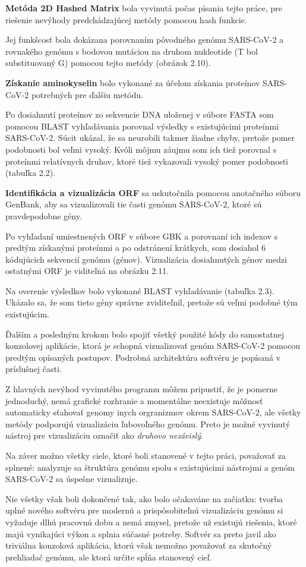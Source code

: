 \textbf{Metóda 2D Hashed Matrix } bola vyvinutá počas písania tejto práce, pre riešenie nevýhody predchádzajúcej metódy pomocou hash funkcie.

Jej funkšcosť bola dokázana porovnaním pôvodného genómu SARS-CoV-2 a rovnakého genómu s bodovou mutáciou na druhom nukleotide (T bol substituovaný G) pomocou tejto metódy (obrázok 2.10).

\textbf{Získanie aminokyselin} bolo vykonané za účelom získania proteínov SARS-CoV-2 potrebných pre ďalšiu metódu.

Po dosiahnutí proteínov zo sekvencie DNA uloženej v súbore FASTA som pomocou BLAST vyhľadávania porovnal výsledky s existujúcimi proteínmi SARS-CoV-2.
Súcit ukázal, že sa neurobili takmer žiadne chyby, pretože pomer podobnosti bol veľmi vysoký.
Kvôli môjmu záujmu som ich tiež porovnal s proteínmi relatívnych druhov, ktoré tiež vykazovali vysoký pomer podobnosti (tabuľka 2.2).

\textbf{Identifikácia a vizualizácia ORF} sa uskutočnila pomocou anotačného súboru GenBank, aby sa vizualizovali tie časti genómu SARS-CoV-2, ktoré sú pravdepodobne gény.

Po vyhľadaní umiestnených ORF v súbore GBK a porovnaní ich indexov s predtým získanými proteínmi a po odstránení krátkych, som dosiahol 6 kódujúcich sekvencií genómu (génov).
Vizualizácia dosiahnutých génov medzi ostatnými ORF je viditeľná na obrázku 2.11.

Na overenie výsledkov bolo vykonané BLAST vyhľadávanie (tabuľka 2.3).
Ukázalo sa, že som tieto gény správne zviditeľnil, pretože sú veľmi podobné tým existujúcim.

\smallskip

Ďalším a posledným krokom bolo spojiť všetký použité kódy do samostatnej konzolovej aplikácie, ktorá je schopná vizualizovať genóm SARS-CoV-2 pomocou predtým opísaných postupov.
Podrobná architektúra softvéru je popísaná v príslušnej časti.

Z hlavných nevýhod vyvinutého programu môžem pripustiť, že je pomerne jednoduchý, nemá grafické rozhranie a momentálne neexistuje môžnosť automaticky sťahovať genomy inych orgranizmov okrem SARS-CoV-2, ale všetky metódy podporujú vizualizáciu ľubovoľného genómu.
Preto je možné vyvinutý nástroj pre vizualizáciu označiť ako \textit{druhovo nezávislý}.

\smallskip
Na záver možno všetky ciele, ktoré boli stanovené v tejto práci, považovať za splnené: analyzuje sa štruktúra genómu spolu s existujúcimi nástrojmi a genóm SARS-CoV-2 sa úspešne vizualizuje.

Nie všetky však boli dokončené tak, ako bolo očakaváne na začiatku: tvorba uplné nového softvéru pre modernú a prispôsobiteľnú vizualizáciu genómu si vyžaduje dlhú pracovnú dobu a nemá zmysel, pretože už existujú riešenia, ktoré majú vynikajúci výkon a splnia súčasné potreby.
Softvér sa preto javil ako triviálna konzolová aplikácia, ktorú však nemožno považovať za skutočný prehliadač genómu, ale ktorá určite spĺňa stanovený cieľ.

\label{evaluation}